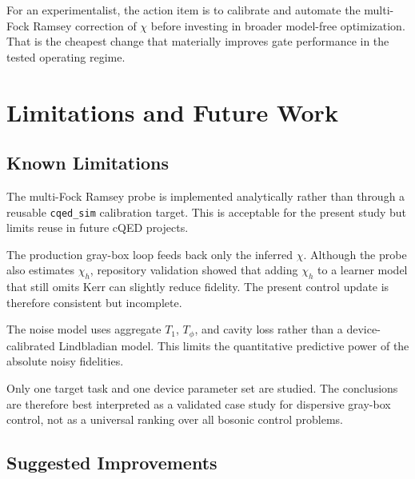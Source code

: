 \documentclass[aps,pra,twocolumn,reprint,amsmath,amssymb]{revtex4-2}
\begin{document}
For an experimentalist, the action item is to calibrate and automate the multi-Fock Ramsey correction of $\chi$ before investing in broader model-free optimization. That is the cheapest change that materially improves gate performance in the tested operating regime.

\section{Limitations and Future Work}

\subsection{Known Limitations}

The multi-Fock Ramsey probe is implemented analytically rather than through a reusable
\texttt{cqed\_sim} calibration target. This is acceptable for the present study but limits reuse in
future cQED projects.

The production gray-box loop feeds back only the inferred $\chi$. Although the probe also
estimates $\chi_h$, repository validation showed that adding $\chi_h$ to a learner model that
still omits Kerr can slightly reduce fidelity. The present control update is therefore
consistent but incomplete.

The noise model uses aggregate $T_1$, $T_\phi$, and cavity loss rather than a
device-calibrated Lindbladian model. This limits the quantitative predictive power of the
absolute noisy fidelities.

Only one target task and one device parameter set are studied. The conclusions are therefore
best interpreted as a validated case study for dispersive gray-box control, not as a universal
ranking over all bosonic control problems.

\subsection{Suggested Improvements}
\end{document}
